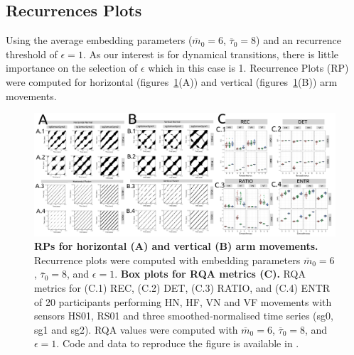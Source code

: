 \documentclass[fleqn,10pt]{wlscirep}
\begin{document}
\subsection*{Recurrences Plots}
Using the average embedding parameters 
($\overline{m}_0=6$, $\overline{\tau}_0=8$) 
and an recurrence threshold of $\epsilon=1$.
As our interest is for dynamical transitions, 
there is little importance on the selection of $\epsilon$ which in this case
is 1. 
Recurrence Plots (RP) were computed for horizontal (figures~\ref{fig05}(A)) and
vertical (figures~\ref{fig05}(B)) arm movements.
\begin{figure}[ht]
\centering
\includegraphics[width=1.0\textwidth]{figures/fig05/versions/drawing-v00}
\caption{
	{\bf RPs for horizontal (A) and vertical (B) arm movements.}	
	Recurrence plots were computed with 
	embedding parameters 
	$\overline{m}_0=6$, $\overline{\tau}_0=8$, and $\epsilon=1$.
	{\bf Box plots for RQA metrics (C).}
	RQA metrics for (C.1) REC, (C.2) DET, (C.3) RATIO, and (C.4) ENTR of
	20 participants performing HN, HF, VN and VF movements
	with sensors HS01, RS01 and three smoothed-normalised
	time series (sg0, sg1 and sg2).
	RQA values were computed with
	$\overline{m}_0=6$, $\overline{\tau}_0=8$, and $\epsilon=1$.
	Code and data to reproduce the figure is available in \cite{srep2021}.
        }
    \label{fig05}
\end{figure}
\end{document}
